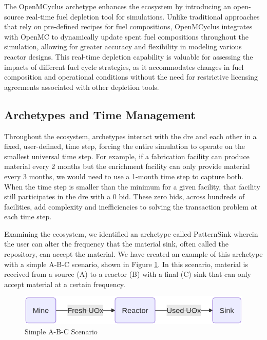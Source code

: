 The OpenMCyclus archetype \cite{openmcyclus_paper} enhances the \cyclus
ecosystem by introducing an open-source real-time fuel depletion tool for
\cyclus simulations. Unlike traditional approaches that rely on pre-defined
recipes for fuel compositions, OpenMCyclus integrates with OpenMC
\cite{romano_openmc_2015} to dynamically update spent fuel compositions
throughout the simulation, allowing for greater accuracy and flexibility in
modeling various reactor designs. This real-time depletion capability is
valuable for assessing the impacts of different fuel cycle strategies, as it
accommodates changes in fuel composition and operational conditions without the
need for restrictive licensing agreements associated with other depletion tools.

\subsection{Archetypes and Time Management}
\label{sec:archetypes_and_time_management}

Throughout the \cyclus ecosystem, archetypes interact with the \gls{dre} and
each other in a fixed, user-defined, time step, forcing the entire simulation
to operate on the smallest universal time step. For example, if a fabrication
facility can produce material every 2 months but the enrichment facility can
only provide material every 3 months, we would need to use a 1-month time step
to capture both. When the time step is smaller than the minimum for a given
facility, that facility still participates in the \gls{dre} with a 0 bid. These
zero bids, across hundreds of facilities, add complexity and inefficiencies to
solving the transaction problem at each time step.

Examining the \cyclus ecosystem, we identified an archetype called PatternSink
wherein the user can alter the frequency that the material sink, often called
the repository, can accept the material. We have created an example of this
archetype with a simple A-B-C scenario, shown in Figure \ref{fig:a-b-c}. In
this scenario, material is received from a source (A) to a reactor (B) with a
final (C) sink that can only accept material at a certain frequency.

\begin{figure}[!ht]
    \centering
    \includegraphics[scale=0.4]{images/cyclus/a-b-c.png}
    \caption{Simple A-B-C Scenario}
    \label{fig:a-b-c}
\end{figure}

